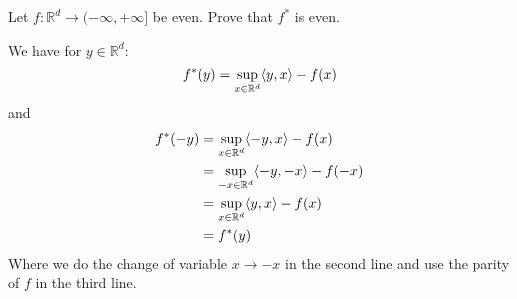 \begin{exercise}[]{}
	Let $ f: \mathbb{R}^d \rightarrow (-\infty,+\infty] $ be even. Prove that $ f^{*} $ is even.
\end{exercise}

\begin{solution}[]
	We have for $ y\in \mathbb{R}^d $:
\begin{equation*}
	f^{*}(y) = \sup_{x\in \mathbb{R}^d} \langle y,x\rangle - f(x)
\end{equation*}
and 
\begin{align*}
	f^{*}(-y) &= \sup_{x \in \mathbb{R}^d} \langle-y,x\rangle - f(x) \\
		  &= \sup_{-x\in \mathbb{R}^d} \langle-y,-x\rangle - f(-x) \\
		  &= \sup_{x\in \mathbb{R}^d} \langle y,x\rangle - f(x) \\
		  &= f^{*}(y)
\end{align*}
Where we do the change of variable $ x \rightarrow -x $ in the second line and use the parity of $ f $ in the third line.
\end{solution}

